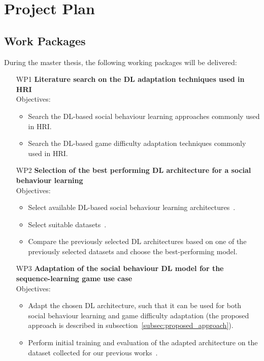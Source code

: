 \documentclass[thesis]{mas_proposal}
\begin{document}
\section{Project Plan}

\subsection{Work Packages}
During the master thesis, the following working packages will be delivered:

\begin{enumerate}
	\item[WP1] \textbf{Literature search on the DL adaptation techniques used in HRI} \\ Objectives:
	\begin{itemize}
		\item Search the DL-based social behaviour learning approaches commonly used in HRI.
		\item Search the DL-based game difficulty adaptation techniques commonly used in HRI. 
	\end{itemize}
	\item [WP2] \textbf{Selection of the best performing DL architecture for a social behaviour learning} \\
	Objectives:
	\begin{itemize}
		\item Select available DL-based social behaviour learning architectures~\cite{Romeo2018,Romeo2019,Qureshi2016,Qureshi2017,Belo2022}.
		\item Select suitable datasets~\cite{Ko2021,Shahroudy_2016_CVPR,Liu2020,patrona2021overview}.
		\item Compare the previously selected DL architectures based on one of the previously selected datasets and choose the best-performing model.
	\end{itemize}
	\item [WP3] \textbf{Adaptation of the social behaviour DL model for the sequence-learning game use case} \\
	Objectives:
	\begin{itemize}
		\item Adapt the chosen DL architecture, such that it can be used for both social behaviour learning and game difficulty adaptation (the proposed approach is described in subsection~\ref{subsec:proposed_approach}).
		\item Perform initial training and evaluation of the adapted architecture on the dataset collected for our previous works~\cite{stolarz2022personalisedrobot,stolarz2022learningbased}.

\end{itemize}
\end{enumerate}
\end{document}
